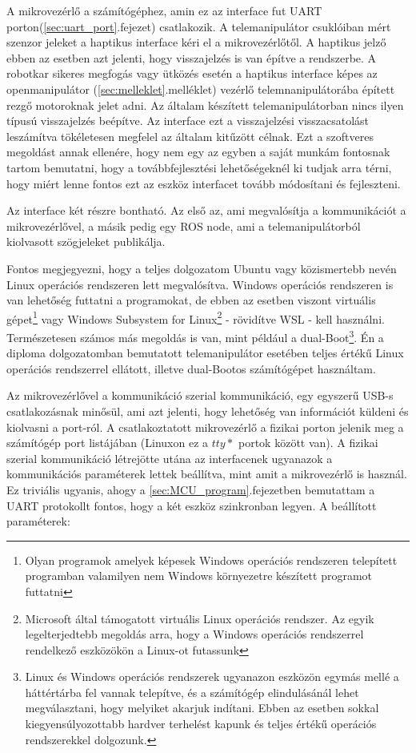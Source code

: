 A mikrovezérlő a számítógéphez, amin ez az interface fut UART porton(\ref{sec:uart_port}.fejezet) csatlakozik. A telemanipulátor csuklóiban mért szenzor jeleket a haptikus interface kéri el a mikrovezérlőtől. A haptikus jelző ebben az esetben azt jelenti, hogy visszajelzés is van építve a rendszerbe. A robotkar sikeres megfogás vagy ütközés esetén a haptikus interface képes az openmanipulátor (\ref{sec:melleklet}.melléklet) vezérlő telemnanipulátorába épített rezgő motoroknak jelet adni. Az általam készített telemanipulátorban nincs ilyen típusú visszajelzés beépítve. Az interface ezt a visszajelzési visszacsatolást leszámítva tökéletesen megfelel az általam kitűzött célnak. Ezt a szoftveres megoldást annak ellenére, hogy nem egy az egyben a saját munkám fontosnak tartom bemutatni, hogy a továbbfejlesztési lehetőségeknél ki tudjak arra térni, hogy miért lenne fontos ezt az eszköz interfacet tovább módosítani és fejleszteni.\cite{MogiHapticDevice}

Az interface két részre bontható. Az első az, ami megvalósítja a kommunikációt a mikrovezérlővel, a másik pedig egy ROS node, ami a telemanipulátorból kiolvasott szögjeleket publikálja.\cite{MogiHapticDevice}

Fontos megjegyezni, hogy a teljes dolgozatom Ubuntu vagy közismertebb nevén Linux operációs rendszeren lett megvalósítva. Windows operációs rendszeren is van lehetőség futtatni a programokat, de ebben az esetben viszont virtuális gépet\footnote{Olyan programok amelyek képesek Windows operációs rendszeren telepített programban valamilyen nem Windows környezetre készített programot futtatni} vagy Windows Subsystem for Linux\footnote{Microsoft által támogatott virtuális Linux operációs rendszer. Az egyik legelterjedtebb megoldás arra, hogy a Windows operációs rendszerrel rendelkező eszközökön a Linux-ot futassunk} - rövidítve WSL - kell használni. Természetesen számos más megoldás is van, mint például a dual-Boot\footnote{Linux és Windows operációs rendszerek ugyanazon eszközön egymás mellé a háttértárba fel vannak telepítve, és a számítógép elindulásánál lehet megválasztani, hogy melyiket akarjuk indítani. Ebben az esetben sokkal kiegyensúlyozottabb hardver terhelést kapunk és teljes értékű operációs rendszerekkel dolgozunk.}. Én a diploma dolgozatomban bemutatott telemanipulátor esetében teljes értékű Linux operációs rendszerrel ellátott, illetve dual-Bootos számítógépet használtam.\cite{MogiHapticDevice}

Az mikrovezérlővel a kommunikáció szerial kommunikáció, egy egyszerű USB-s csatlakozásnak minősül, ami azt jelenti, hogy lehetőség van információt küldeni és kiolvasni a port-ról. A csatlakoztatott mikrovezérlő a fizikai porton jelenik meg a számítógép port listájában (Linuxon ez a $tty*$ portok között van). A fizikai szerial kommunikáció létrejötte utána az interfacenek ugyanazok a kommunikációs paraméterek lettek beállítva, mint amit a mikrovezérlő is használ. Ez triviális ugyanis, ahogy a \ref{sec:MCU_program}.fejezetben bemutattam a UART protokollt fontos, hogy a két eszköz szinkronban legyen. A beállított paraméterek:\cite{MogiHapticDevice}

